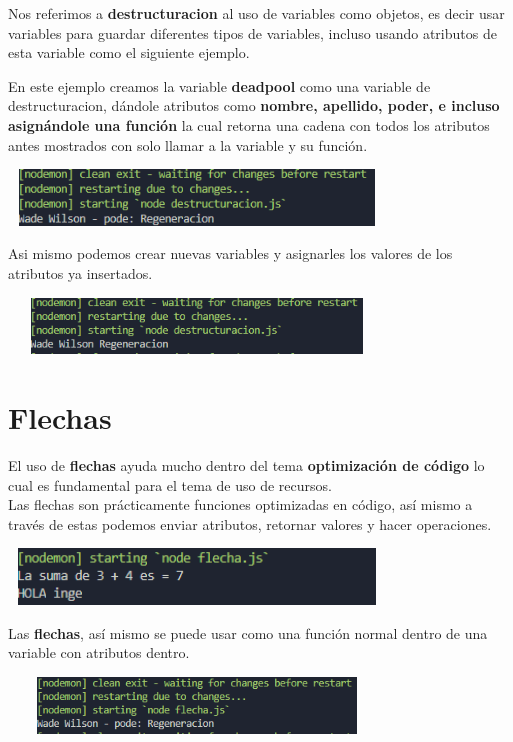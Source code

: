 \documentclass{report}
\begin{document}
Nos referimos a \textbf{destructuracion} al uso de variables como objetos, es decir usar variables para guardar diferentes tipos de variables, incluso usando atributos de esta variable como el siguiente ejemplo.

En este ejemplo creamos la variable \textbf{deadpool} como una variable de destructuracion, dándole atributos como  \textbf{nombre, apellido, poder, e incluso asignándole una función} la cual retorna una cadena con todos los atributos antes mostrados con solo llamar a la variable y su función.
\begin{center}
  \includegraphics[width=10cm, height=1.5cm]{6.PNG}
\end{center}
Asi mismo podemos crear nuevas variables y asignarles los valores de los atributos ya insertados.

\begin{center}
  \includegraphics[width=10cm, height=1.5cm]{7.PNG}
\end{center}

\chapter{Flechas}

El uso de \textbf{flechas} ayuda mucho dentro del tema \textbf{optimización de código} lo cual es fundamental para el tema de uso de recursos.\\
Las flechas son prácticamente funciones optimizadas en código, así mismo a través de estas podemos enviar atributos, retornar valores y hacer operaciones.

\begin{center}
  \includegraphics[width=10cm, height=1.5cm]{8.PNG}
\end{center}
Las \textbf{flechas}, así mismo se puede usar como una función normal dentro de una variable con atributos dentro.

\begin{center}
  \includegraphics[width=10cm, height=1.5cm]{9.PNG}
\end{center}
\end{document}
